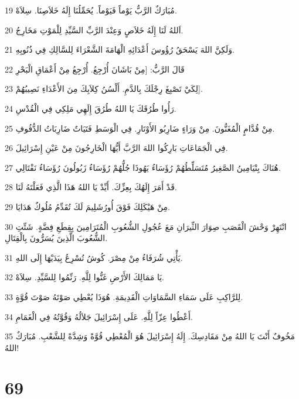 \par 19 مُبَارَكٌ الرَّبُّ يَوْماً فَيَوْماً. يُحَمِّلُنَا إِلَهُ خَلاَصِنَا. سِلاَهْ.
\par 20 اَللهُ لَنَا إِلَهُ خَلاَصٍ وَعِنْدَ الرَّبِّ السَّيِّدِ لِلْمَوْتِ مَخَارِجُ.
\par 21 وَلَكِنَّ اللهَ يَسْحَقُ رُؤُوسَ أَعْدَائِهِ الْهَامَةَ الشَّعْرَاءَ لِلسَّالِكِ فِي ذُنُوبِهِ.
\par 22 قَالَ الرَّبُّ: [مِنْ بَاشَانَ أُرْجِعُ. أُرْجِعُ مِنْ أَعْمَاقِ الْبَحْرِ
\par 23 لِكَيْ تَصْبِغَ رِجْلَكَ بِالدَّمِ. أَلْسُنُ كِلاَبِكَ مِنَ الأَعْدَاءِ نَصِيبُهُمْ].
\par 24 رَأُوا طُرُقَكَ يَا اللهُ طُرُقَ إِلَهِي مَلِكِي فِي الْقُدْسِ.
\par 25 مِنْ قُدَّامٍ الْمُغَنُّونَ. مِنْ وَرَاءٍ ضَارِبُو الأَوْتَارِ. فِي الْوَسَطِ فَتَيَاتٌ ضَارِبَاتُ الدُّفُوفِ.
\par 26 فِي الْجَمَاعَاتِ بَارِكُوا اللهَ الرَّبَّ أَيُّهَا الْخَارِجُونَ مِنْ عَيْنِ إِسْرَائِيلَ.
\par 27 هُنَاكَ بِنْيَامِينُ الصَّغِيرُ مُتَسَلِّطُهُمْ رُؤَسَاءُ يَهُوذَا جُلُّهُمْ رُؤَسَاءُ زَبُولُونَ رُؤَسَاءُ نَفْتَالِي.
\par 28 قَدْ أَمَرَ إِلَهُكَ بِعِزِّكَ. أَيِّدْ يَا اللهُ هَذَا الَّذِي فَعَلْتَهُ لَنَا.
\par 29 مِنْ هَيْكَلِكَ فَوْقَ أُورُشَلِيمَ لَكَ تُقَدِّمُ مُلُوكٌ هَدَايَا.
\par 30 انْتَهِرْ وَحْشَ الْقَصَبِ صِوَارَ الثِّيرَانِ مَعَ عُجُولِ الشُّعُوبِ الْمُتَرَامِينَ بِقِطَعِ فِضَّةٍ. شَتِّتِ الشُّعُوبَ الَّذِينَ يُسَرُّونَ بِالْقِتَالِ.
\par 31 يَأْتِي شُرَفَاءُ مِنْ مِصْرَ. كُوشُ تُسْرِعُ بِيَدَيْهَا إِلَى اللهِ.
\par 32 يَا مَمَالِكَ الأَرْضِ غَنُّوا لِلَّهِ. رَنِّمُوا لِلسَّيِّدِ. سِلاَهْ.
\par 33 لِلرَّاكِبِ عَلَى سَمَاءِ السَّمَاوَاتِ الْقَدِيمَةِ. هُوَذَا يُعْطِي صَوْتَهُ صَوْتَ قُوَّةٍ.
\par 34 أَعْطُوا عِزّاً لِلَّهِ. عَلَى إِسْرَائِيلَ جَلاَلُهُ وَقُوَّتُهُ فِي الْغَمَامِ.
\par 35 مَخُوفٌ أَنْتَ يَا اللهُ مِنْ مَقَادِسِكَ. إِلَهُ إِسْرَائِيلَ هُوَ الْمُعْطِي قُوَّةً وَشِدَّةً لِلشَّعْبِ. مُبَارَكٌ اللهُ!

\chapter{69}

